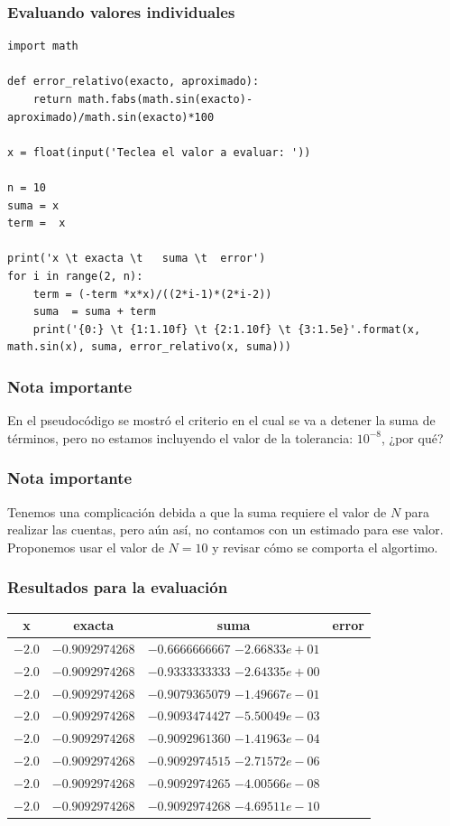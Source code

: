 \begin{frame}
\frametitle{Evaluando valores individuales}
\begin{lstlisting}[style=codigopython]
import math

def error_relativo(exacto, aproximado):
    return math.fabs(math.sin(exacto)- aproximado)/math.sin(exacto)*100

x = float(input('Teclea el valor a evaluar: '))

n = 10
suma = x
term =  x

print('x \t exacta \t   suma \t  error')
for i in range(2, n):
    term = (-term *x*x)/((2*i-1)*(2*i-2))
    suma  = suma + term
    print('{0:} \t {1:1.10f} \t {2:1.10f} \t {3:1.5e}'.format(x, math.sin(x), suma, error_relativo(x, suma)))
\end{lstlisting}
\end{frame}
\begin{frame}
\frametitle{Nota importante}
En el pseudocódigo se mostró el criterio en el cual se va a detener la suma de términos, pero no estamos incluyendo el valor de la tolerancia: $10^{-8}$, ¿por qué?
\end{frame}
\begin{frame}
\frametitle{Nota importante}
Tenemos una complicación debida a que la suma requiere el valor de $N$ para realizar las cuentas, pero aún así, no contamos con un estimado para ese valor.
\\
\bigskip
Proponemos usar el valor de $N = 10$ y revisar cómo se comporta el algortimo.
\end{frame}
\begin{frame}[fragile]
\frametitle{Resultados para la evaluación}
\begin{table}
\fontsize{12}{12}\selectfont
\begin{tabular}{c c c c}
x & exacta & suma & error \\ \hline
$-2.0$ & $-0.9092974268$ & $-0.6666666667$  $-2.66833e+01$ \\ \hline
$-2.0$ & $-0.9092974268$ & $-0.9333333333$  $-2.64335e+00$ \\ \hline
$-2.0$ & $-0.9092974268$ & $-0.9079365079$  $-1.49667e-01$ \\ \hline
$-2.0$ & $-0.9092974268$ & $-0.9093474427$  $-5.50049e-03$ \\ \hline
$-2.0$ & $-0.9092974268$ & $-0.9092961360$  $-1.41963e-04$ \\ \hline
$-2.0$ & $-0.9092974268$ & $-0.9092974515$  $-2.71572e-06$ \\ \hline
$-2.0$ & $-0.9092974268$ & $-0.9092974265$  $-4.00566e-08$ \\ \hline
$-2.0$ & $-0.9092974268$ & $-0.9092974268$  $-4.69511e-10$ \\ \hline
\end{tabular}
\end{table}
\end{frame}
